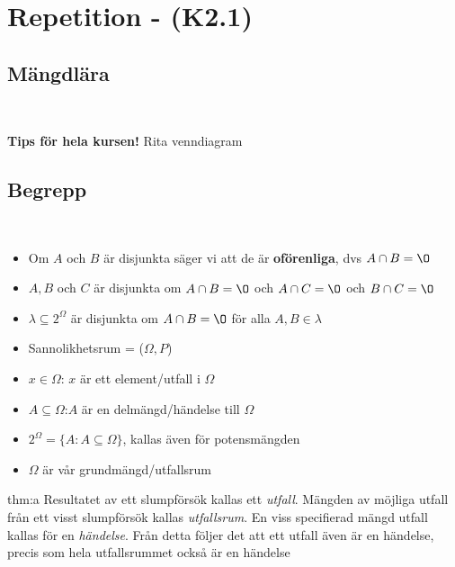 \section{Repetition - (K2.1)}
\subsection{Mängdlära}\hfill\\
\par
\noindent \textbf{Tips för hela kursen!} Rita venndiagram\par

\par\bigskip
\subsection{Begrepp}\hfill\\
\par
\begin{itemize}
  \item Om $A$ och $B$ är disjunkta säger vi att de är \textbf{oförenliga}, dvs $A\cap B = \O$\par\par
  \item $A,B$ och $C$ är disjunkta om $A\cap B = \O$ och $A\cap C = \O$ och $B\cap C=\O$\par
  \item $\lambda\subseteq 2^{\Omega}$ är disjunkta om $A\cap B = \O$ för alla $A,B\in\lambda$\par
  \item Sannolikhetsrum = ($\Omega, P$)
  \item $x\in\Omega$: $x$ är ett element/utfall i $\Omega$\par
  \item $A\subseteq\Omega$:$A$ är en delmängd/händelse till $\Omega$\par
  \item $2^{\Omega} = \{A:A\subseteq\Omega\}$, kallas även för potensmängden
  \item $\Omega$ är vår grundmängd/utfallsrum\par
\end{itemize}
\par\bigskip
\begin{theo}{thm:a}
  Resultatet av ett slumpförsök kallas ett \textit{utfall}. Mängden av möjliga utfall från ett visst slumpförsök kallas \textit{utfallsrum}. En viss specifierad mängd utfall kallas för en \textit{händelse}. Från detta följer det att ett utfall även är en händelse, precis som hela utfallsrummet också är en händelse 
\end{theo}
